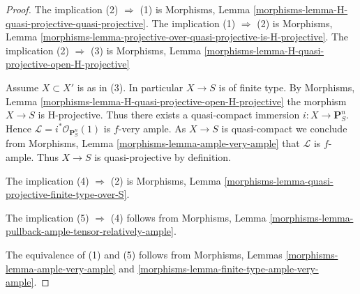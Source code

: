 \documentclass[10pt,a4paper]{amsart}
\theoremstyle{plain}
\theoremstyle{definition}
\theoremstyle{remark}
\numberwithin{equation}{subsection}
\begin{document}
\begin{proof}
The implication (2) $\Rightarrow$ (1) is
Morphisms, Lemma \ref{morphisms-lemma-H-quasi-projective-quasi-projective}.
The implication (1) $\Rightarrow$ (2) is
Morphisms, Lemma
\ref{morphisms-lemma-projective-over-quasi-projective-is-H-projective}.
The implication (2) $\Rightarrow$ (3) is
Morphisms, Lemma \ref{morphisms-lemma-H-quasi-projective-open-H-projective}

\medskip\noindent
Assume $X \subset X'$ is as in (3). In particular $X \to S$ is
of finite type. By
Morphisms, Lemma \ref{morphisms-lemma-H-quasi-projective-open-H-projective}
the morphism $X \to S$ is H-projective.
Thus there exists a quasi-compact immersion $i : X \to \mathbf{P}^n_S$.
Hence $\mathcal{L} = i^*\mathcal{O}_{\mathbf{P}^n_S}(1)$
is $f$-very ample. As $X \to S$ is quasi-compact we conclude from
Morphisms, Lemma \ref{morphisms-lemma-ample-very-ample}
that $\mathcal{L}$ is $f$-ample. Thus $X \to S$ is quasi-projective
by definition.

\medskip\noindent
The implication (4) $\Rightarrow$ (2) is
Morphisms, Lemma \ref{morphisms-lemma-quasi-projective-finite-type-over-S}.

\medskip\noindent
The implication (5) $\Rightarrow$ (4) follows from
Morphisms, Lemma \ref{morphisms-lemma-pullback-ample-tensor-relatively-ample}.

\medskip\noindent
The equivalence of (1) and (5) follows from
Morphisms, Lemmas \ref{morphisms-lemma-ample-very-ample} and
\ref{morphisms-lemma-finite-type-ample-very-ample}.
\end{proof}
\end{document}
